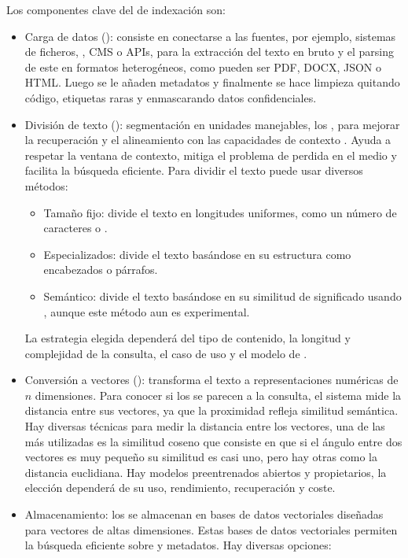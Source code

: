 Los componentes clave del  de indexación son:
\begin{itemize}
\tightlist
	\item Carga de datos (): consiste en conectarse a las fuentes, por ejemplo, sistemas de ficheros, , CMS o APIs, para la extracción del texto en bruto y el parsing de este en formatos heterogéneos, como pueden ser PDF, DOCX, JSON o HTML. Luego se le añaden metadatos y finalmente se hace limpieza quitando código, etiquetas raras y enmascarando datos confidenciales.
	\item División de texto (): segmentación en unidades manejables, los , para mejorar la recuperación y el alineamiento con las capacidades de contexto . Ayuda a respetar la ventana de contexto, mitiga el problema de perdida en el medio y facilita la búsqueda eficiente. Para dividir el texto puede usar diversos métodos:
	\begin{itemize}
		\item Tamaño fijo: divide el texto en longitudes uniformes, como un número de caracteres o .
		\item Especializados: divide el texto basándose en su estructura como encabezados o párrafos. 
		\item Semántico: divide el texto basándose en su similitud de significado usando , aunque este método aun es experimental.
	\end{itemize}
	La estrategia elegida dependerá del tipo de contenido, la longitud y complejidad de la consulta, el caso de uso y el modelo de .
	\item Conversión a vectores (): transforma el texto a representaciones numéricas de $n$ dimensiones. Para conocer si los  se parecen a la consulta, el sistema mide la distancia entre sus vectores, ya que la proximidad refleja similitud semántica. Hay diversas técnicas para medir la distancia entre los vectores, una de las más utilizadas es la similitud coseno que consiste en que si el ángulo entre dos vectores es muy pequeño su similitud es casi uno, pero hay otras como la distancia euclidiana. Hay modelos preentrenados abiertos y propietarios, la elección dependerá de su uso, rendimiento, recuperación y coste.
	\item Almacenamiento: los  se almacenan en bases de datos vectoriales diseñadas para vectores de altas dimensiones. Estas bases de datos vectoriales permiten la búsqueda eficiente sobre  y metadatos. Hay diversas opciones:

\end{itemize}
